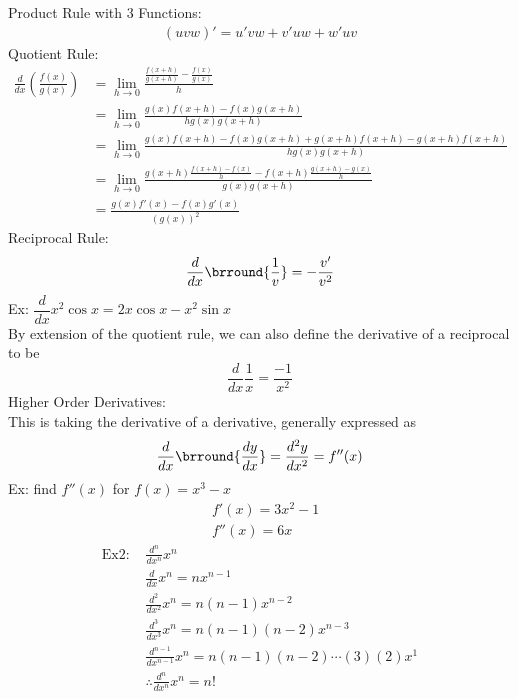 Product Rule with 3 Functions:
\begin{align*}
    (uvw)'=u'vw+v'uw+w'uv
\end{align*}
Quotient Rule:
\begin{align*}
    \frac{d}{dx}\left(\frac{f(x)}{g(x)}\right)&=\lim_{h\to 0}\frac{\frac{f(x+h)}{g(x+h)}-\frac{f(x)}{g(x)}}{h}\\
    &=\lim_{h\to 0}\frac{g(x)f(x+h)-f(x)g(x+h)}{hg(x)g(x+h)}\\
    &=\lim_{h\to 0}\frac{g(x)f(x+h)-f(x)g(x+h)+g(x+h)f(x+h)-g(x+h)f(x+h)}{hg(x)g(x+h)}\\
    &=\lim_{h\to 0}\frac{g(x+h)\frac{f(x+h)-f(x)}{h}-f(x+h)\frac{g(x+h)-g(x)}{h}}{g(x)g(x+h)}\\
    &=\frac{g(x)f'(x)-f(x)g'(x)}{(g(x))^2}
\end{align*}
Reciprocal Rule:
\begin{align*}
    \frac{d}{dx}\brround{\frac{1}{v}}=-\frac{v'}{v^2}
\end{align*}
Ex: $\dfrac{d}{dx}x^2\cos x=2x\cos x-x^2\sin x$\\
By extension of the quotient rule, we can also define the derivative of a reciprocal to be
$$\frac{d}{dx}\frac{1}{x}=\frac{-1}{x^2}$$
Higher Order Derivatives:\\
This is taking the derivative of a derivative, generally expressed as $$\frac{d}{dx}\brround{\frac{dy}{dx}}=\frac{d^2y}{dx^2}=f''(x)$$
Ex: find $f''(x)$ for $f(x)=x^3-x$
\begin{align*}
    &f'(x)=3x^2-1\\
    &f''(x)=6x
\end{align*}
\begin{align*}
    \text{Ex2: }&\frac{d^n}{dx^n}x^n\\
    &\frac{d}{dx}x^n=nx^{n-1}\\
    &\frac{d^2}{dx^2}x^n=n(n-1)x^{n-2}\\
    &\frac{d^3}{dx^3}x^n=n(n-1)(n-2)x^{n-3}\\
    &\frac{d^{n-1}}{dx^{n-1}}x^n=n(n-1)(n-2)\cdots(3)(2)x^1\\
    &\therefore\frac{d^n}{dx^n}x^n=n!
\end{align*}

